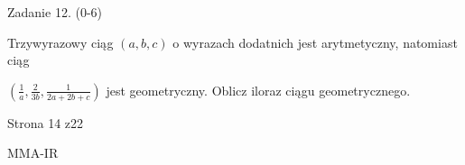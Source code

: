\documentclass[a4paper,12pt]{article}
\begin{document}
Zadanie 12. (0-6)

Trzywyrazowy ciąg $(a,b,c)$ o wyrazach dodatnich jest arytmetyczny, natomiast ciąg

$(\displaystyle \frac{1}{a},\frac{2}{3b},\frac{1}{2a+2b+c})$ jest geometryczny. Oblicz iloraz ciągu geometrycznego.

Strona 14 z22

MMA-IR
\end{document}
